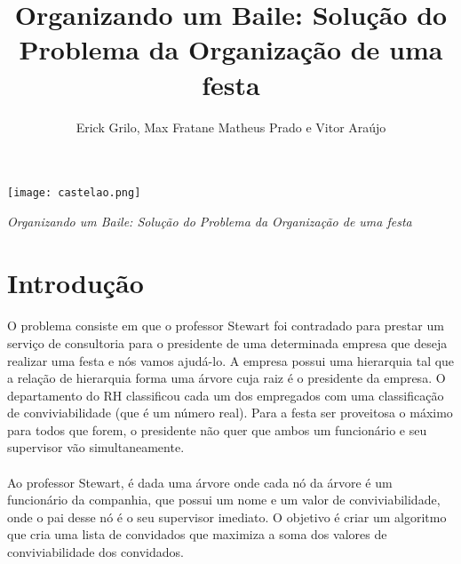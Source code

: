 \documentclass[a4paper]{article}
\title{Organizando um Baile: Solução do Problema da Organização de uma festa}
\author{Erick Grilo, Max Fratane   Matheus Prado e Vitor Araújo}
\begin{document}
\begin{flushright}
\thispagestyle{empty}
\texttt{[image: castelao.png]}
\end{flushright}

\begin{center}
\vfill
\vspace{-7em}
\emph{\Large Organizando um Baile: Solução do Problema da Organização de uma festa}
\begin{flushright}
\vspace{1em}
\end{flushright}
\vfill
\end{center}

\newpage

\section{Introdução}
\paragraph{} O problema consiste em que o professor Stewart foi contradado para prestar um serviço de consultoria para o presidente de uma determinada empresa que deseja realizar uma festa e nós vamos ajudá-lo. A empresa possui uma hierarquia tal que a relação de hierarquia forma uma árvore %
cuja raiz é o presidente da empresa. O departamento do RH classificou cada um dos empregados com uma classificação de conviviabilidade (que é um número real). Para a festa ser proveitosa o máximo para todos que forem, o presidente não quer que ambos um funcionário e seu supervisor vão simultaneamente.
\paragraph{} Ao professor Stewart, é dada uma árvore %
onde cada nó da árvore é um funcionário da companhia, que possui um nome e um valor de conviviabilidade, onde o pai desse nó é o seu supervisor imediato. O objetivo é criar um algoritmo que cria uma lista de convidados que maximiza a soma dos valores de conviviabilidade dos convidados.
\end{document}
